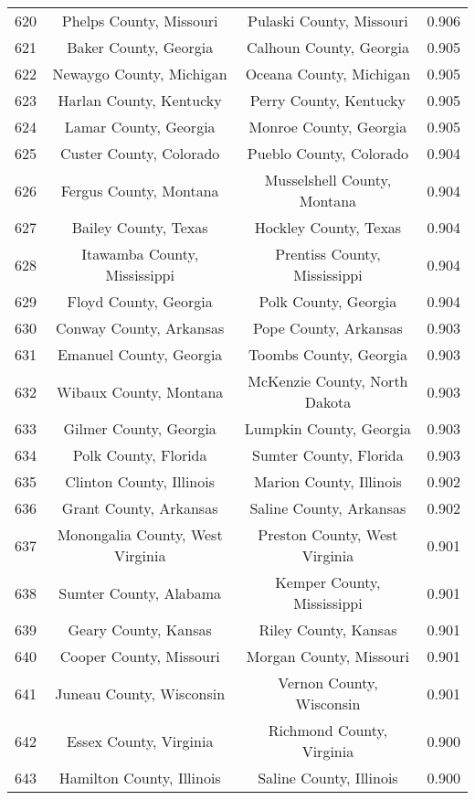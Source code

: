\begin{longtable}{cccc}
  620 & Phelps County, Missouri & Pulaski County, Missouri & 0.906 \\ 
  621 & Baker County, Georgia & Calhoun County, Georgia & 0.905 \\ 
  622 & Newaygo County, Michigan & Oceana County, Michigan & 0.905 \\ 
  623 & Harlan County, Kentucky & Perry County, Kentucky & 0.905 \\ 
  624 & Lamar County, Georgia & Monroe County, Georgia & 0.905 \\ 
  625 & Custer County, Colorado & Pueblo County, Colorado & 0.904 \\ 
  626 & Fergus County, Montana & Musselshell County, Montana & 0.904 \\ 
  627 & Bailey County, Texas & Hockley County, Texas & 0.904 \\ 
  628 & Itawamba County, Mississippi & Prentiss County, Mississippi & 0.904 \\ 
  629 & Floyd County, Georgia & Polk County, Georgia & 0.904 \\ 
  630 & Conway County, Arkansas & Pope County, Arkansas & 0.903 \\ 
  631 & Emanuel County, Georgia & Toombs County, Georgia & 0.903 \\ 
  632 & Wibaux County, Montana & McKenzie County, North Dakota & 0.903 \\ 
  633 & Gilmer County, Georgia & Lumpkin County, Georgia & 0.903 \\ 
  634 & Polk County, Florida & Sumter County, Florida & 0.903 \\ 
  635 & Clinton County, Illinois & Marion County, Illinois & 0.902 \\ 
  636 & Grant County, Arkansas & Saline County, Arkansas & 0.902 \\ 
  637 & Monongalia County, West Virginia & Preston County, West Virginia & 0.901 \\ 
  638 & Sumter County, Alabama & Kemper County, Mississippi & 0.901 \\ 
  639 & Geary County, Kansas & Riley County, Kansas & 0.901 \\ 
  640 & Cooper County, Missouri & Morgan County, Missouri & 0.901 \\ 
  641 & Juneau County, Wisconsin & Vernon County, Wisconsin & 0.901 \\ 
  642 & Essex County, Virginia & Richmond County, Virginia & 0.900 \\ 
  643 & Hamilton County, Illinois & Saline County, Illinois & 0.900 \\ 

\end{longtable}
